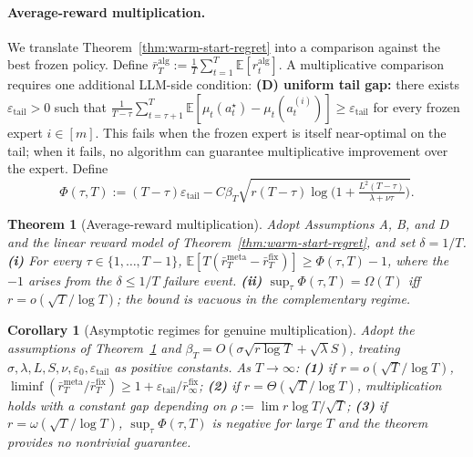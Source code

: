 \documentclass{article}
\newtheorem{theorem}{Theorem}
\newtheorem{corollary}{Corollary}
\theoremstyle{definition}
\theoremstyle{remark}
\newcommand{\alg}{\mathrm{alg}}
\newcommand{\meta}{\mathrm{meta}}
\newcommand{\fix}{\mathrm{fix}}
\theoremstyle{remark}
\begin{document}
\paragraph{Average-reward multiplication.}
We translate Theorem~\ref{thm:warm-start-regret} into a comparison against
the best frozen policy. Define
$\bar r_T^{\alg}:=\frac{1}{T}\sum_{t=1}^T \mathbb E[r_t^{\alg}]$. A
multiplicative comparison requires one additional LLM-side condition:
\textbf{(D) uniform tail gap:} there exists $\varepsilon_{\mathrm{tail}}>0$
such that $\frac{1}{T-\tau}\sum_{t=\tau+1}^T\mathbb E[\mu_t(a_t^\star)
-\mu_t(a_t^{(i)})]\ge\varepsilon_{\mathrm{tail}}$ for every frozen expert
$i\!\in\![m]$. This fails when the frozen expert is itself near-optimal on
the tail; when it fails, no algorithm can guarantee multiplicative
improvement over the expert. Define
\begin{equation}
\label{eq:phi-balance}
\Phi(\tau,T)
:=
(T-\tau)\varepsilon_{\mathrm{tail}}
- C\beta_T\sqrt{r(T-\tau)\log\!\bigl(1+\tfrac{L^2(T-\tau)}{\lambda+\nu\tau}\bigr)}.
\end{equation}

\begin{theorem}[Average-reward multiplication]
\label{thm:avg-mult}
Adopt Assumptions A, B, and D and the linear reward model of
Theorem~\ref{thm:warm-start-regret}, and set $\delta=1/T$.
\textbf{(i)} For every $\tau\in\{1,\dots,T-1\}$,
$\mathbb E[T(\bar r_T^{\meta}-\bar r_T^{\fix})]\ge\Phi(\tau,T)-1$, where
the $-1$ arises from the $\delta\le 1/T$ failure event.
\textbf{(ii)} $\sup_\tau\Phi(\tau,T)=\Omega(T)$ iff $r=o(\sqrt T/\log T)$;
the bound is vacuous in the complementary regime.
\end{theorem}

\begin{corollary}[Asymptotic regimes for genuine multiplication]
\label{cor:asymptotic-mult}
Adopt the assumptions of Theorem~\ref{thm:avg-mult} and
$\beta_T=O(\sigma\sqrt{r\log T}+\sqrt\lambda S)$, treating
$\sigma,\lambda,L,S,\nu,\varepsilon_0,\varepsilon_{\mathrm{tail}}$ as
positive constants. As $T\to\infty$:
\textbf{(1)} if $r=o(\sqrt T/\log T)$,
$\liminf(\bar r_T^{\meta}/\bar r_T^{\fix})\ge 1+\varepsilon_{\mathrm{tail}}/\bar r_\infty^{\fix}$;
\textbf{(2)} if $r=\Theta(\sqrt T/\log T)$, multiplication holds with a
constant gap depending on $\rho:=\lim r\log T/\sqrt T$;
\textbf{(3)} if $r=\omega(\sqrt T/\log T)$, $\sup_\tau\Phi(\tau,T)$ is
negative for large $T$ and the theorem provides no nontrivial guarantee.
\end{corollary}
\end{document}

